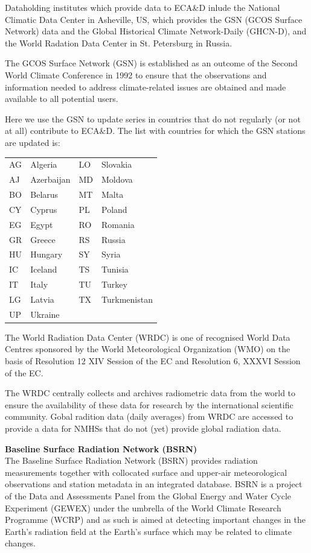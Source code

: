 \documentclass[a4paper,11pt]{article}
\begin{document}
Dataholding institutes which provide data to ECA\&D inlude the National Climatic Data Center in Asheville, US, which
provides the GSN (GCOS Surface Network) data and the Global Historical Climate Network-Daily (GHCN-D), and the
World Radation Data Center in St. Petersburg in Russia. 

The GCOS Surface Network (GSN) is established as an outcome of the Second World Climate Conference in 1992 to ensure that the observations and information
needed to address climate-related issues are obtained and made available to all potential users.

Here we use the GSN to update series in countries that do not regularly (or not at all) contribute to ECA\&D. The list with countries for which the GSN stations
are updated is:\\
\begin{tabular}{l@{: }l|l@{: }l}
AG & Algeria & LO & Slovakia\\
AJ & Azerbaijan & MD & Moldova\\
BO & Belarus & MT & Malta\\
CY & Cyprus & PL & Poland\\
EG & Egypt & RO & Romania\\
GR & Greece & RS & Russia\\
HU & Hungary & SY & Syria\\
IC & Iceland & TS & Tunisia\\
IT & Italy & TU & Turkey\\
LG & Latvia & TX & Turkmenistan\\
UP & Ukraine & & \\
\end{tabular}

The World Radiation Data Center (WRDC) is one of recognised World Data Centres sponsored by the World Meteorological Organization (WMO) on the basis of Resolution 12 XIV 
Session of the EC and Resolution 6, XXXVI Session of the EC.

The WRDC centrally collects and archives radiometric data from the world to ensure the availability of these data for research by the international scientific community. 
Gobal radition data (daily averages) from WRDC are accessed to provide a data for NMHSs that do not (yet) provide global radiation data.

\vspace{0.5cm}
\noindent
{\bf Baseline Surface Radiation Network (BSRN)}\\
The Baseline Surface Radiation Network (BSRN) provides radiation measurements together with collocated surface and upper-air meteorological observations and station 
metadata in an integrated database. BSRN is a project of the Data and Assessments Panel from the Global Energy and Water Cycle Experiment (GEWEX) under the umbrella 
of the World Climate Research Programme (WCRP) and as such is aimed at detecting important changes in the Earth's radiation field at the Earth's surface which may be 
related to climate changes.
\end{document}
